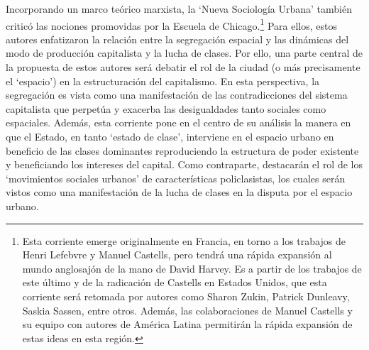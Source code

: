 \documentclass[
  spanish,
  a4paper,%
  chapterprefix=true,%
  DIV=calc,%
  twoside]{scrbook}%
\begin{document}
Incorporando un marco teórico marxista, la `Nueva Sociología Urbana'
también criticó las nociones promovidas por la Escuela de
Chicago.\footnote{Esta corriente emerge originalmente en Francia, en
  torno a los trabajos de Henri Lefebvre y Manuel Castells, pero
  tendrá una rápida expansión al mundo anglosajón de la mano de David
  Harvey. Es a partir de los trabajos de este último y de la
  radicación de Castells en Estados Unidos, que esta corriente será
  retomada por autores como Sharon Zukin, Patrick Dunleavy, Saskia
  Sassen, entre otros. Además, las colaboraciones de Manuel Castells y
  su equipo con autores de América Latina permitirán la rápida
  expansión de estas ideas en esta región.} Para ellos, estos autores enfatizaron la
relación entre la segregación espacial y las dinámicas del modo de
producción capitalista y la lucha de clases. Por ello, una parte central
de la propuesta de estos autores será debatir el rol de la ciudad (o más
precisamente el `espacio') en la estructuración del capitalismo. En esta
perspectiva, la segregación es vista como una manifestación de las
contradicciones del sistema capitalista que perpetúa y exacerba las
desigualdades tanto sociales como espaciales. Además, esta corriente
pone en el centro de su análisis la manera en que el Estado, en tanto
`estado de clase', interviene en el espacio urbano en beneficio de las
clases dominantes reproduciendo la estructura de poder existente y
beneficiando los intereses del capital. Como contraparte, destacarán el
rol de los `movimientos sociales urbanos' de características
policlasistas, los cuales serán vistos como una manifestación de la
lucha de clases en la disputa por el espacio urbano.
\end{document}

